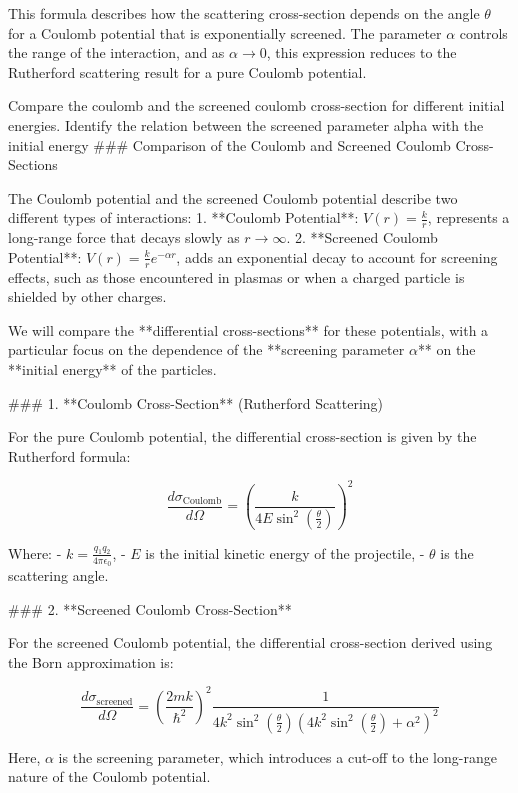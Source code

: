 This formula describes how the scattering cross-section depends on the angle \( \theta \) for a Coulomb potential that is exponentially screened. The parameter \( \alpha \) controls the range of the interaction, and as \( \alpha \to 0 \), this expression reduces to the Rutherford scattering result for a pure Coulomb potential.

Compare the coulomb and the screened coulomb cross-section for different initial energies. Identify the relation between the screened parameter alpha with the initial energy
### Comparison of the Coulomb and Screened Coulomb Cross-Sections

The Coulomb potential and the screened Coulomb potential describe two different types of interactions:
1. **Coulomb Potential**: \( V(r) = \frac{k}{r} \), represents a long-range force that decays slowly as \( r \to \infty \).
2. **Screened Coulomb Potential**: \( V(r) = \frac{k}{r} e^{-\alpha r} \), adds an exponential decay to account for screening effects, such as those encountered in plasmas or when a charged particle is shielded by other charges.

We will compare the **differential cross-sections** for these potentials, with a particular focus on the dependence of the **screening parameter \( \alpha \)** on the **initial energy** of the particles.

### 1. **Coulomb Cross-Section** (Rutherford Scattering)

For the pure Coulomb potential, the differential cross-section is given by the Rutherford formula:

\[
\frac{d\sigma_{\text{Coulomb}}}{d\Omega} = \left( \frac{k}{4 E \sin^2\left(\frac{\theta}{2}\right)} \right)^2
\]

Where:
- \( k = \frac{q_1 q_2}{4 \pi \epsilon_0} \),
- \( E \) is the initial kinetic energy of the projectile,
- \( \theta \) is the scattering angle.

### 2. **Screened Coulomb Cross-Section**

For the screened Coulomb potential, the differential cross-section derived using the Born approximation is:

\[
\frac{d\sigma_{\text{screened}}}{d\Omega} = \left( \frac{2 m k}{\hbar^2} \right)^2 \frac{1}{4 k^2 \sin^2\left( \frac{\theta}{2} \right) \left( 4 k^2 \sin^2\left( \frac{\theta}{2} \right) + \alpha^2 \right)^2}
\]

Here, \( \alpha \) is the screening parameter, which introduces a cut-off to the long-range nature of the Coulomb potential.

